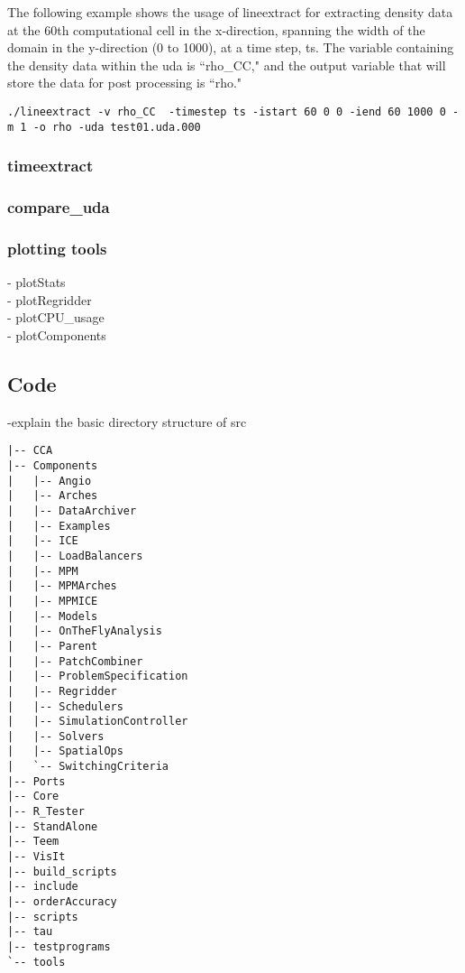 The following example shows the usage of lineextract for extracting density data at the 60th computational cell in the x-direction, spanning the width of the domain in the y-direction (0 to 1000), at a time step, ts. The variable containing the density data within the uda is ``rho\_CC," and the output variable that will store the data for post processing is ``rho."
\begin{Verbatim}[fontsize=\footnotesize]
./lineextract -v rho_CC  -timestep ts -istart 60 0 0 -iend 60 1000 0 -m 1 -o rho -uda test01.uda.000
\end{Verbatim}


\subsubsection{timeextract}

\subsubsection{compare\_uda}

\subsubsection{plotting tools}
- plotStats\\
- plotRegridder \\
- plotCPU\_usage \\
- plotComponents

\subsection{Code}
-explain the basic directory structure of src
\begin{Verbatim}[fontsize=\footnotesize]
|-- CCA
|-- Components
|   |-- Angio
|   |-- Arches
|   |-- DataArchiver
|   |-- Examples
|   |-- ICE
|   |-- LoadBalancers
|   |-- MPM
|   |-- MPMArches
|   |-- MPMICE
|   |-- Models
|   |-- OnTheFlyAnalysis
|   |-- Parent
|   |-- PatchCombiner
|   |-- ProblemSpecification
|   |-- Regridder
|   |-- Schedulers
|   |-- SimulationController
|   |-- Solvers
|   |-- SpatialOps
|   `-- SwitchingCriteria
|-- Ports
|-- Core
|-- R_Tester
|-- StandAlone
|-- Teem
|-- VisIt
|-- build_scripts
|-- include
|-- orderAccuracy
|-- scripts
|-- tau
|-- testprograms
`-- tools
\end{Verbatim}
